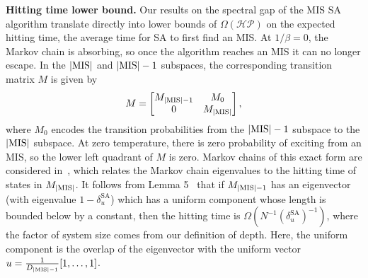 \documentclass[twocolumn,amssymb,secnumarabic, prl, aps, nofootinbib]{revtex4-1}
\newcommand{\MIS}{\textnormal{MIS}}
\newcommand{\DMISminusone}{D_{|\textnormal{MIS}|-1}}
\begin{document}
\noindent\textbf{Hitting time lower bound.}
Our results on the spectral gap of the MIS SA algorithm  translate directly into lower bounds of $\Omega(\mathcal{HP})$ on the expected hitting time, the average time for SA to first find an MIS.  At $1/\beta=0$, the Markov chain is absorbing, so once the algorithm reaches an MIS it can no longer escape. In the $|\MIS|$ and $|\MIS|-1$ subspaces,
the corresponding transition matrix $M$ is given by
\begin{equation}
	M = \begin{bmatrix}
		M_{|\MIS| -1} & M_0 \label{eq:markov_chain_matrix}\\
		0 & M_{|\MIS| }
	\end{bmatrix},
\end{equation} 
where $M_0$ encodes the transition probabilities from the $|\MIS|-1$ subspace to the $|\MIS|$ subspace. At zero temperature, there is zero probability of exciting from an MIS, so the lower left quadrant of $M$ is zero. 
Markov chains of this exact form are considered in~\cite{sze04}, which relates the Markov chain eigenvalues to the hitting time of states in $M_{|\MIS|}$. It follows from Lemma 5~\cite{sze04} that if $M_{|\MIS|-1}$ has an eigenvector (with eigenvalue $1-\delta_{u}^{\text{SA}}$) which has a uniform component whose length is bounded below by a constant, then the hitting time is $\Omega(N^{-1}(\delta_{u}^{\text{SA}})^{-1})$, where the factor of system size comes from our definition of depth. Here, the uniform component is the overlap of the eigenvector with the uniform vector $u = \frac{1}{\DMISminusone}[1, \dots, 1]$.
\end{document}
